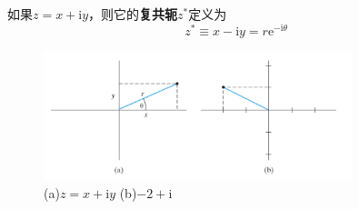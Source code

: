 	如果$z = x + \mathrm{i}y$，则它的\textbf{复共轭}$z^{\ast}$定义为
	\begin{equation}
		z^{\ast} \equiv x - \mathrm{i}y = r \mathrm{e} ^{-\mathrm{i}\theta}
		\label{eq:1.29 definition of complexconjugate}
	\end{equation}
		\begin{figure}[h!]
		\centering
		\includegraphics[width=0.8\textwidth]{Figures/1.3.png}  %
		\caption{(a)$z = x + \mathrm{i}y$  (b)$-2+\mathrm{i}$}
		\label{fig:1.3}
	\end{figure}

